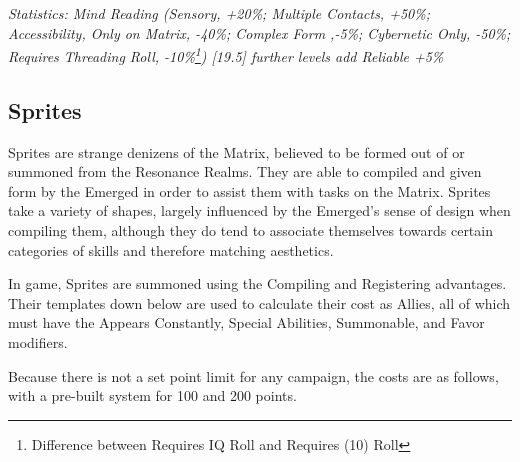 \begin{multicols*}{3}
	\textcolor{OliveGreen}{\textit{Statistics: Mind Reading (Sensory, +20\%; Multiple Contacts, +50\%; Accessibility, Only on Matrix, -40\%; Complex Form ,-5\%; Cybernetic Only, -50\%; Requires Threading Roll, -10\%\footnote{Difference between Requires IQ Roll and Requires (10) Roll}) [19.5] further levels add Reliable +5\%}}
	
\subsection{Sprites}

Sprites are strange denizens of the Matrix, believed to be formed out of or summoned from the Resonance Realms. They are able to compiled and given form by the Emerged in order to assist them with tasks on the Matrix. Sprites take a variety of shapes, largely influenced by the Emerged's sense of design when compiling them, although they do tend to associate themselves towards certain categories of skills and therefore matching aesthetics.

In game, Sprites are summoned using the Compiling and Registering advantages. Their templates down below are used to calculate their cost as Allies, all of which must have the Appears Constantly, Special Abilities, Summonable, and Favor modifiers.

Because there is not a set point limit for any campaign, the costs are as follows, with a pre-built system for 100 and 200 points.


\end{multicols*}
